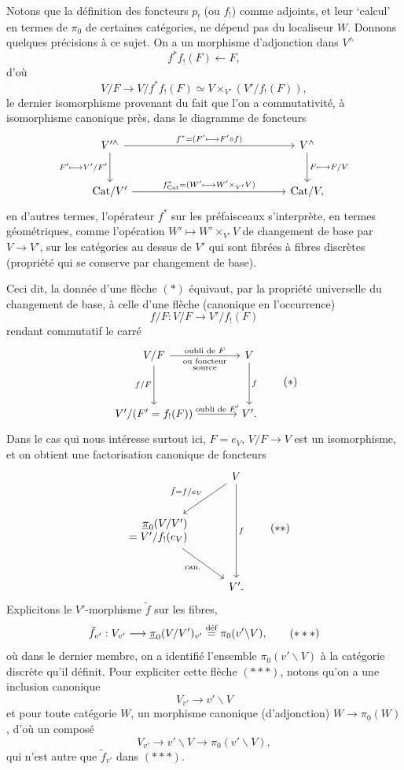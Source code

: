 Notons que la définition des foncteurs $p_!$ (ou $f_!$) comme adjoints, et leur `calcul' en termes de $\pi_0$ de certaines catégories, ne dépend pas du localiseur $W$. Donnons quelques précisions à ce sujet. On a un morphisme d'adjonction dans $V^{\wedge}$
\[ f^*f_!(F) \longleftarrow F, \]
d'où
\[ V/F \longrightarrow V/f^*f_!(F) \simeq V \times_{V'} (V'/f_!(F)), \tag*{$(*)$} \]
le dernier isomorphisme provenant du fait que l'on a commutativité, à isomorphisme canonique près, dans le diagramme de foncteurs
\[
\begin{tikzcd}[column sep=14em, row sep=large]
V'^{\wedge} \arrow[r, "f^*=(F'\longmapsto F'\circ f)"] \arrow[d, "F'\longmapsto V'/F'"'] & V^{\wedge} \arrow[d, "F\longmapsto F/V"] \\
\Cat/V' \arrow[r, "f^*_{\Cat}=(W'\longmapsto W'\times_{V'}V)"] & \Cat/V,
\end{tikzcd}
\]
en d'autres termes, l'opérateur $f^*$ sur les préfaisceaux s'interprète, en termes géométriques, comme l'opération $W' \longmapsto W' \times_{V'} V$ de changement de base par $V \longrightarrow V'$, sur les catégories au dessus de $V'$ qui sont fibrées à fibres discrètes (propriété qui se conserve par changement de base).

Ceci dit, la donnée d'une flèche $(*)$ équivaut, par la propriété universelle du changement de base, à celle d'une flèche (canonique en l'occurrence)
\[ f/F : V/F \longrightarrow V'/f_!(F) \]
rendant commutatif le carré
\[
\begin{tikzcd}[column sep=large, row sep=huge]
V/F \arrow[r, "\text{oubli de }F", "\substack{\text{ou foncteur}\\ \text{source}}"'] \arrow[d, "f/F"'] & V \arrow[d, "f"] \\
V'/(F' = f_!(F)) \arrow[r, "\text{oubli de }F'"] & V'.
\end{tikzcd}
\tag*{$(*)$}
\]
Dans le cas qui nous intéresse surtout ici, $F = e_V$, $V/F \longrightarrow V$ est un isomorphisme, et on obtient une factorisation canonique de foncteurs 
\[
\begin{tikzcd}[row sep=large]
 & V \arrow[dl, "\tilde{f}=f/e_V"'] \arrow[dd, "f"] \\
\begin{array}{r} \upi_0(V/V') \\ = V'/f_!(e_V) \end{array} \arrow[dr, "\text{can.}"'] & \\
 & V'.
\end{tikzcd}
\tag*{$(**)$}
\]
Explicitons le $V'$-morphisme $\tilde{f}$ sur les fibres,
\[ \tilde{f}_{v'} : V_{v'} \longrightarrow \upi_0(V/V')_{v'} \defeq \pi_0(v'\backslash V), \tag*{$(***)$} \]
où dans le dernier membre, on a identifié l'ensemble $\pi_0(v'\backslash V)$ à la catégorie discrète qu'il définit. Pour expliciter cette flèche $(***)$, notons qu'on a une inclusion canonique
\[ V_{v'} \longrightarrow v'\backslash V \]
et pour toute catégorie $W$, un morphisme canonique (d'adjonction) $W \longrightarrow \pi_0(W)$, d'où un composé
\[ V_{v'} \longrightarrow v'\backslash V \longrightarrow \pi_0(v'\backslash V), \]
qui n'est autre que $\tilde{f}_{v'}$ dans $(***)$.

